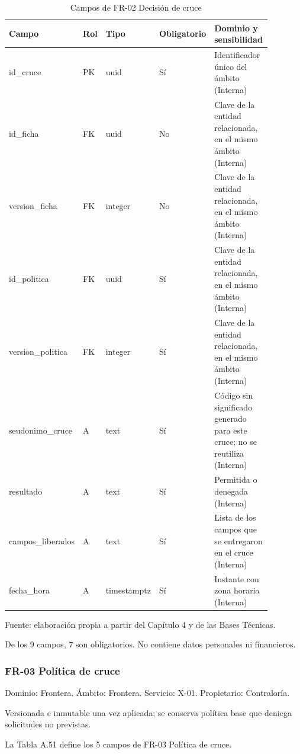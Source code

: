 \documentclass[11pt]{article}
\begin{document}
\begin{table}[htbp]
\caption{Campos de FR-02 Decisión de cruce}\label{tab:d_fr02}
\centering
\begin{tabular}{@{}p{0.167\linewidth}p{0.070\linewidth}p{0.079\linewidth}p{0.097\linewidth}p{0.465\linewidth}@{}}
\toprule Campo & Rol & Tipo & Obligatorio & Dominio y sensibilidad \\
\midrule
id\_cruce & PK & uuid & Sí & Identificador único del ámbito (Interna) \\
id\_ficha & FK & uuid & No & Clave de la entidad relacionada, en el mismo ámbito (Interna) \\
version\_ficha & FK & integer & No & Clave de la entidad relacionada, en el mismo ámbito (Interna) \\
id\_politica & FK & uuid & Sí & Clave de la entidad relacionada, en el mismo ámbito (Interna) \\
version\_politica & FK & integer & Sí & Clave de la entidad relacionada, en el mismo ámbito (Interna) \\
seudonimo\_cruce & A & text & Sí & Código sin significado generado para este cruce; no se reutiliza (Interna) \\
resultado & A & text & Sí & Permitida o denegada (Interna) \\
campos\_liberados & A & text & Sí & Lista de los campos que se entregaron en el cruce (Interna) \\
fecha\_hora & A & timestamptz & Sí & Instante con zona horaria (Interna) \\
\bottomrule
\end{tabular}
\par\smallskip
{\raggedright Fuente: elaboración propia a partir del Capítulo 4 y de las Bases Técnicas.\par}
\end{table}


De los 9 campos, 7 son obligatorios. No contiene datos personales ni financieros.

\subsubsection{FR-03 Política de cruce}

Dominio: Frontera. Ámbito: Frontera. Servicio: X-01. Propietario: Contraloría.

Versionada e inmutable una vez aplicada; se conserva política base que deniega solicitudes no previstas.

La Tabla A.51 define los 5 campos de FR-03 Política de cruce.
\end{document}
